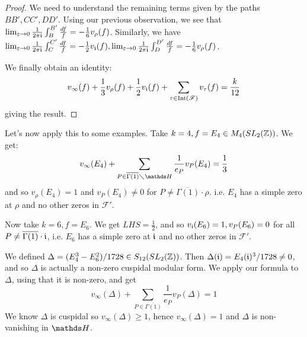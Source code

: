 \documentclass[10pt,a4paper]{article}
\begin{document}
\begin{proof}
  We need to understand the remaining terms given by the paths $BB', CC', DD'$. Using our previous observation, we see that $\lim_{\varepsilon \to 0} \frac{1}{2\pi\mathfrak{i}}\int_B^{B'} \frac{df}{f} = -\frac16 v_\rho(f)$. Similarly, we have $\lim_{\varepsilon \to 0}\frac{1}{2\pi\mathfrak{i}} \int_C^{C'} \frac{df}{f} = -\frac12 v_{\mathfrak{i}}(f), \lim_{\varepsilon \to 0}\frac{1}{2\pi\mathfrak{i}} \int_D^{D'} \frac{df}{f} = -\frac16 v_\rho(f)$.

  We finally obtain an identity:
  \[v_\infty(f) + \frac{1}{3}v_\rho(f) + \frac12 v_{\mathfrak{i}}(f) + \sum_{\tau \in \operatorname{Int}(\mathscr{F})}v_\tau(f) = \frac{k}{12}\]
  giving the result.
\end{proof}
Let's now apply this to some examples. Take $k=4, f = E_4 \in M_4(SL_2(\mathbb{Z}))$. We get:
\[v_\infty(E_4) + \sum_{P \in \overline{\Gamma(1)}\diagdown \H}\frac{1}{e_P}v_P(E_4) = \frac{1}{3}\]
and so $v_\rho(E_4) = 1$ and $v_P(E_4) \neq 0$ for $P \neq \overline{\Gamma(1)}\cdot\rho$. i.e. $E_4$ has a simple zero at $\rho$ and no other zeros in $\mathscr{F}'$.

Now take $k= 6, f = E_6$. We get $LHS = \frac{1}{2}$, and so $v_{\mathfrak{i}}(E_6) = 1, v_P(E_6) = 0$ for all $P \neq \overline{\Gamma(1)}\cdot \mathfrak{i}$, i.e. $E_6$ has a simple zero at $\mathfrak{i}$ and no other zeros in $\mathscr{F}'$.

We defined $\Delta = (E_4^3-E_6^2)/1728 \in S_{12}(SL_2(\mathbb{Z}))$. Then $\Delta(\mathfrak{i}) = E_4(\mathfrak{i})^3/1728 \neq 0$, and so $\Delta$ is actually a non-zero cuspidal modular form. We apply our formula to $\Delta$, using that it is non-zero, and get
\[v_\infty(\Delta) + \sum_{P \in \overline{\Gamma(1)}} \frac{1}{e_P}v_P(\Delta) = 1\]
We know $\Delta$ is cuspidal so $v_\infty(\Delta) \geq 1$, hence $v_\infty(\Delta) = 1$ and $\Delta$ is non-vanishing in $\H$.
\end{document}
